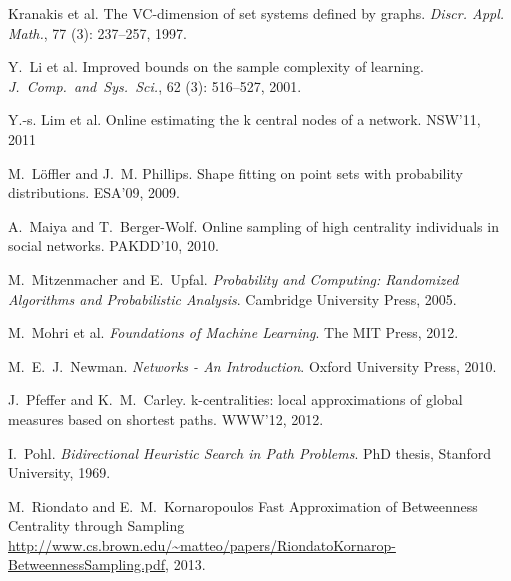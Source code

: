 \begin{thebibliography}{33}
Kranakis et al.
\newblock The {VC}-dimension of set systems defined by graphs.
\newblock \emph{Discr. Appl. Math.}, 77 (3):
  237--257, 1997.

Y.~Li et al.
\newblock Improved bounds on the sample complexity of learning.
\newblock \emph{J.~Comp.~and~Sys.~Sci.}, 62
  (3): 516--527, 2001.

Y.-s. Lim et al.
\newblock Online estimating the k central nodes of a network.
\newblock NSW'11, 2011

M.~L\"{o}ffler and J.~M. Phillips.
\newblock Shape fitting on point sets with probability distributions.
\newblock ESA'09, 2009.

A.~Maiya and T.~Berger-Wolf.
\newblock Online sampling of high centrality individuals in social networks.
\newblock PAKDD'10, 2010.

M.~Mitzenmacher and E.~Upfal.
\newblock \emph{Probability and Computing: Randomized Algorithms and
  Probabilistic Analysis}.
\newblock Cambridge University Press, 2005.

M.~Mohri et al.
\newblock \emph{Foundations of Machine Learning}.
\newblock The MIT Press, 2012.

M.~E.~J.~Newman.
\newblock \emph{Networks - An Introduction}.
\newblock Oxford University Press, 2010.

J.~Pfeffer and K.~M.~Carley.
\newblock k-centralities: local approximations of global measures based on
  shortest paths.
\newblock WWW'12, 2012.

I.~Pohl.
\newblock \emph{Bidirectional Heuristic Search in Path Problems}.
\newblock PhD thesis, Stanford University, 1969.

 M.~Riondato and E.~M.~Kornaropoulos
 \newblock Fast Approximation of Betweenness Centrality through Sampling
 \newblock
 \url{http://www.cs.brown.edu/~matteo/papers/RiondatoKornarop-BetweennessSampling.pdf}, 2013.


\end{thebibliography}
